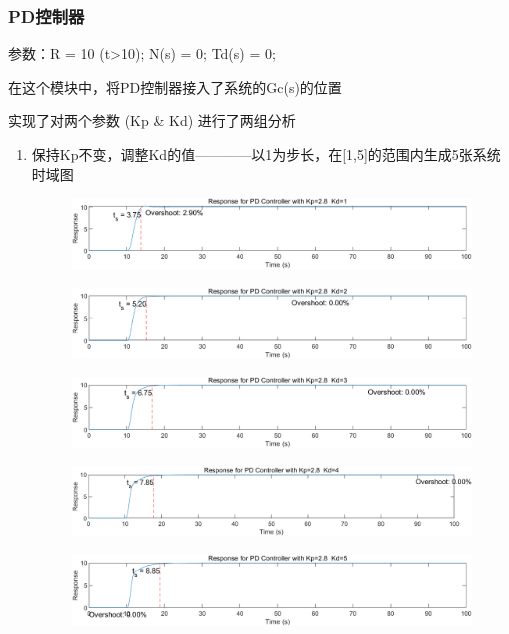 \documentclass{thuemp}
\begin{document}
\subsubsection{PD控制器}
参数：R = 10 (t>10);  N(s) = 0;  Td(s) = 0;

在这个模块中，将PD控制器接入了系统的Gc(s)的位置

实现了对两个参数 (Kp \& Kd) 进行了两组分析
\begin{enumerate}
  \item 保持Kp不变，调整Kd的值————以1为步长，在[1,5]的范围内生成5张系统时域图
  \begin{figure}[H]
    \centering
    \includegraphics[width=1\linewidth]{./img/PD/p1.png}
  \end{figure}
  \begin{figure}[H]
    \centering
    \includegraphics[width=1\linewidth]{./img/PD/p2.png}
  \end{figure}
  \begin{figure}[H]
    \centering
    \includegraphics[width=1\linewidth]{./img/PD/p3.png}
  \end{figure}
  \begin{figure}[H]
    \centering
    \includegraphics[width=1\linewidth]{./img/PD/p4.png}
  \end{figure}
  \begin{figure}[H]
    \centering
    \includegraphics[width=1\linewidth]{./img/PD/p5.png}
  \end{figure}


\end{enumerate}
\end{document}
